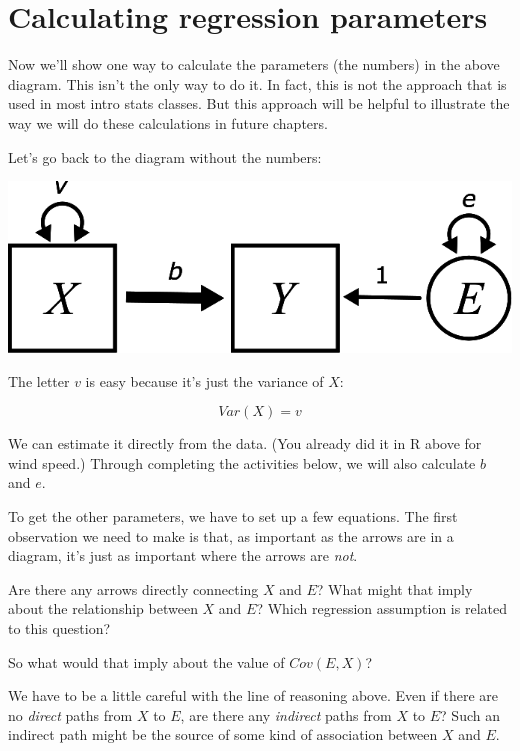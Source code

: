 \documentclass[
]{book}
\begin{document}
\hypertarget{simple-calculating}{%
\section{Calculating regression parameters}\label{simple-calculating}}

Now we'll show one way to calculate the parameters (the numbers) in the above diagram. This isn't the only way to do it. In fact, this is not the approach that is used in most intro stats classes. But this approach will be helpful to illustrate the way we will do these calculations in future chapters.

Let's go back to the diagram without the numbers:

\begin{center}\includegraphics{graphics/simple_regression_params} \end{center}

The letter \(v\) is easy because it's just the variance of \(X\):

\[
Var(X) = v
\]

We can estimate it directly from the data. (You already did it in R above for wind speed.) Through completing the activities below, we will also calculate \(b\) and \(e\).

To get the other parameters, we have to set up a few equations.
The first observation we need to make is that, as important as the arrows are in a diagram, it's just as important where the arrows are \emph{not}.

Are there any arrows directly connecting \(X\) and \(E\)? What might that imply about the relationship between \(X\) and \(E\)? Which regression assumption is related to this question?

So what would that imply about the value of \(Cov(E, X)\)?

We have to be a little careful with the line of reasoning above. Even if there are no \emph{direct} paths from \(X\) to \(E\), are there any \emph{indirect} paths from \(X\) to \(E\)? Such an indirect path might be the source of some kind of association between \(X\) and \(E\).
\end{document}
